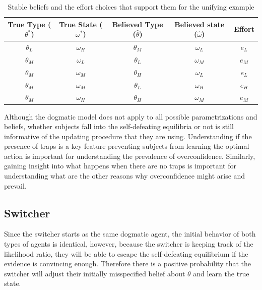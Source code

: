 \documentclass[
  12pt,
]{article}
\begin{document}
\begin{table}[htbp]

    \centering
    \begin{tabular}{|c|c|c|c|c|}
        \hline
        \textbf{True Type ($\theta^*$)} & \textbf{True State ($\omega^*$)} & \textbf{Believed Type ($\hat{\theta}$)} & \textbf{Believed state ($\hat{\omega}$)} & \textbf{Effort} \\
        \hline
        \hline
        $\theta_L$ & $\omega_H$ & $\theta_M$ & $\omega_L$ & $e_L$ \\
        \hline
        $\theta_M$ & $\omega_L$ & $\theta_L$ & $\omega_M$ & $e_M$ \\
        \hline
        $\theta_M$ & $\omega_M$ & $\theta_H$ & $\omega_L$ & $e_L$ \\
        \hline
        $\theta_M$ & $\omega_M$ & $\theta_L$ & $\omega_H$ & $e_H$ \\
        \hline
        $\theta_M$ & $\omega_H$ & $\theta_H$ & $\omega_M$ & $e_M$ \\
        \hline
        
        
    \end{tabular}
    \caption{Stable beliefs and the effort choices that support them for the unifying example}
    \label{tab:table-dog}
\end{table}

Although the dogmatic model does not apply to all possible
parametrizations and beliefs, whether subjects fall into the
self-defeating equilibria or not is still informative of the updating
procedure that they are using. Understanding if the presence of traps is
a key feature preventing subjects from learning the optimal action is
important for understanding the prevalence of overconfidence. Similarly,
gaining insight into what happens when there are no traps is important
for understanding what are the other reasons why overconfidence might
arise and prevail.

\hypertarget{switcher}{%
\subsection{Switcher}\label{switcher}}

Since the switcher starts as the same dogmatic agent, the initial
behavior of both types of agents is identical, however, because the
switcher is keeping track of the likelihood ratio, they will be able to
escape the self-defeating equilibrium if the evidence is convincing
enough. Therefore there is a positive probability that the switcher will
adjust their initially misspecified belief about \(\theta\) and learn
the true state.
\end{document}
